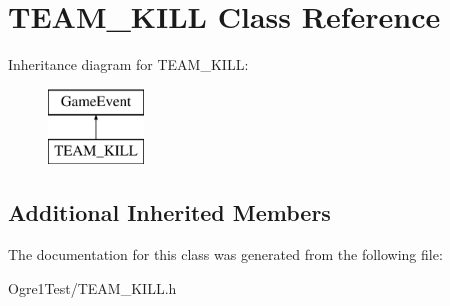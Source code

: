 \hypertarget{class_t_e_a_m___k_i_l_l}{}\section{T\+E\+A\+M\+\_\+\+K\+I\+LL Class Reference}
\label{class_t_e_a_m___k_i_l_l}
Inheritance diagram for T\+E\+A\+M\+\_\+\+K\+I\+LL\+:\begin{figure}[H]
\begin{center}
\leavevmode
\includegraphics[height=2.000000cm]{class_t_e_a_m___k_i_l_l}
\end{center}
\end{figure}
\subsection*{Additional Inherited Members}


The documentation for this class was generated from the following file\+:\begin{DoxyCompactItemize}
\item 
Ogre1\+Test/T\+E\+A\+M\+\_\+\+K\+I\+L\+L.\+h\end{DoxyCompactItemize}

